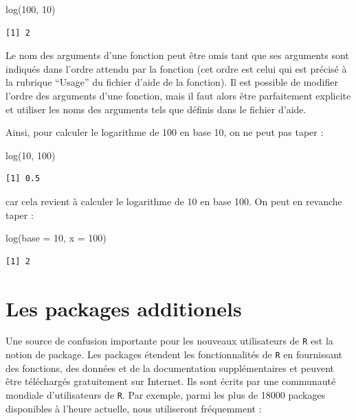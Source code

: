 \documentclass[
  a4paper,
  DIV=11,
  numbers=noendperiod,
  oneside]{scrreprt}
\newenvironment{Shaded}{}{}
\newcommand{\AttributeTok}[1]{\textcolor[rgb]{0.84,0.23,0.29}{#1}}
\newcommand{\DecValTok}[1]{\textcolor[rgb]{0.00,0.36,0.77}{#1}}
\newcommand{\FunctionTok}[1]{\textcolor[rgb]{0.44,0.26,0.76}{#1}}
\newcommand{\NormalTok}[1]{\textcolor[rgb]{0.14,0.16,0.18}{#1}}
\begin{document}
\begin{Shaded}
\begin{Highlighting}[]
\FunctionTok{log}\NormalTok{(}\DecValTok{100}\NormalTok{, }\DecValTok{10}\NormalTok{)}
\end{Highlighting}
\end{Shaded}

\begin{verbatim}
[1] 2
\end{verbatim}

Le nom des arguments d'une fonction peut être omis tant que ses
arguments sont indiqués dans l'ordre attendu par la fonction (cet ordre
est celui qui est précisé à la rubrique ``Usage'' du fichier d'aide de
la fonction). Il est possible de modifier l'ordre des arguments d'une
fonction, mais il faut alors être parfaitement explicite et utiliser les
noms des arguments tels que définis dans le fichier d'aide.

Ainsi, pour calculer le logarithme de 100 en base 10, on ne peut pas
taper :

\begin{Shaded}
\begin{Highlighting}[]
\FunctionTok{log}\NormalTok{(}\DecValTok{10}\NormalTok{, }\DecValTok{100}\NormalTok{)}
\end{Highlighting}
\end{Shaded}

\begin{verbatim}
[1] 0.5
\end{verbatim}

car cela revient à calculer le logarithme de 10 en base 100. On peut en
revanche taper :

\begin{Shaded}
\begin{Highlighting}[]
\FunctionTok{log}\NormalTok{(}\AttributeTok{base =} \DecValTok{10}\NormalTok{, }\AttributeTok{x =} \DecValTok{100}\NormalTok{)}
\end{Highlighting}
\end{Shaded}

\begin{verbatim}
[1] 2
\end{verbatim}

\section{Les packages additionels}\label{sec-packages}

Une source de confusion importante pour les nouveaux utilisateurs de
\texttt{R} est la notion de package. Les packages étendent les
fonctionnalités de \texttt{R} en fournissant des fonctions, des données
et de la documentation supplémentaires et peuvent être téléchargés
gratuitement sur Internet. Ils sont écrits par une communauté mondiale
d'utilisateurs de \texttt{R}. Par exemple, parmi les plus de 18000
packages disponibles à l'heure actuelle, nous utiliseront fréquemment :
\end{document}
